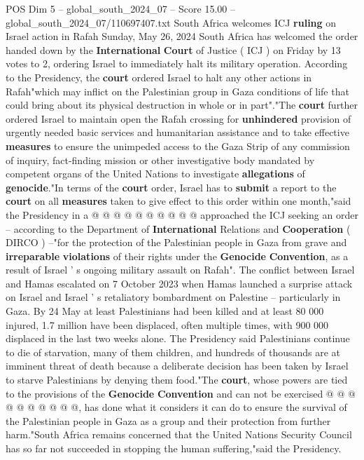 \begin{textsample}{POS Dim 5 – global\_south\_2024\_07 – Score 15.00 – global\_south\_2024\_07/110697407.txt}  \label{ex:f5_pos_167}
South Africa welcomes ICJ \textbf{ruling} on Israel action in Rafah Sunday, May 26, 2024 South Africa has welcomed the order handed down by the \textbf{International} \textbf{Court} of Justice ( ICJ ) on Friday by 13 votes to 2, ordering Israel to immediately halt its military operation.
According to the Presidency, the \textbf{court} ordered Israel to halt any other actions in Rafah"which may inflict on the Palestinian group in Gaza conditions of life that could bring about its physical destruction in whole or in part"."The \textbf{court} further ordered Israel to maintain open the Rafah crossing for \textbf{unhindered} provision of urgently needed basic services and humanitarian assistance and to take effective \textbf{measures} to ensure the unimpeded access to the Gaza Strip of any commission of inquiry, fact-finding mission or other investigative body mandated by competent organs of the United Nations to investigate \textbf{allegations} of \textbf{genocide}."In terms of the \textbf{court} order, Israel has to \textbf{submit} a report to the \textbf{court} on all \textbf{measures} taken to give effect to this order within one month,"said the Presidency in a @ @ @ @ @ @ @ @ @ @ approached the ICJ seeking an order -- according to the Department of \textbf{International} Relations and \textbf{Cooperation} ( DIRCO ) --"for the protection of the Palestinian people in Gaza from grave and \textbf{irreparable} \textbf{violations} of their rights under the \textbf{Genocide} \textbf{Convention}, as a result of Israel ' s ongoing military assault on Rafah".
The conflict between Israel and Hamas escalated on 7 October 2023 when Hamas launched a surprise attack on Israel and Israel ' s retaliatory bombardment on Palestine -- particularly in Gaza.
By 24 May at least Palestinians had been killed and at least 80 000 injured, 1.7 million have been displaced, often multiple times, with 900 000 displaced in the last two weeks alone.
The Presidency said Palestinians continue to die of starvation, many of them children, and hundreds of thousands are at imminent threat of death because a deliberate decision has been taken by Israel to starve Palestinians by denying them food."The \textbf{court}, whose powers are tied to the provisions of the \textbf{Genocide} \textbf{Convention} and can not be exercised @ @ @ @ @ @ @ @ @ @, has done what it considers it can do to ensure the survival of the Palestinian people in Gaza as a group and their protection from further harm."South Africa remains concerned that the United Nations Security Council has so far not succeeded in stopping the human suffering,"said the Presidency.

\end{textsample}
